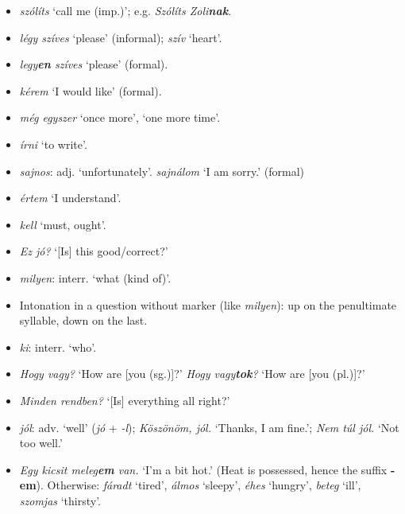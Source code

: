\documentclass[a4paper,11pt]{article}
\begin{document}
\begin{itemize}
  \item \emph{szólíts} `call me (imp.)'; e.g. \emph{Szólíts
  Zoli\textbf{nak}}.

  \item \emph{légy szíves} `please' (informal); \emph{szív} `heart'.

  \item \emph{legy\textbf{en} szíves} `please' (formal).

  \item \emph{kérem} `I would like' (formal).

  \item  \emph{még egyszer} `once more', `one more time'.

  \item \emph{írni} `to write'.

  \item \emph{sajnos}: adj. `unfortunately'. \emph{sajnálom} `I am
    sorry.' (formal)

  \item \emph{értem} `I understand'.

  \item \emph{kell} `must, ought'.

  \item \emph{Ez jó?} `[Is] this good/correct?'

  \item \emph{milyen}: interr. `what (kind of)'.

  \item Intonation in a question without marker (like \emph{milyen}):
    up on the penultimate syllable, down on the last.

  \item \emph{ki}: interr. `who'.

  \item \emph{Hogy vagy?} `How are [you (sg.)]?' \emph{Hogy
  vagy\textbf{tok}?} `How are [you (pl.)]?'

  \item \emph{Minden rendben?} `[Is] everything all right?'

  \item \emph{jól}: adv. `well' (\emph{jó} + \emph{-l});
    \emph{Köszönöm, jól.} `Thanks, I am fine.'; \emph{Nem túl jól.}
    `Not too well.'

  \item \emph{Egy kicsit meleg\textbf{em} van.} `I'm a bit hot.'
    (Heat is possessed, hence the suffix \textbf{-em}). Otherwise:
    \emph{fáradt} `tired', \emph{álmos} `sleepy', \emph{éhes}
    `hungry', \emph{beteg} `ill', \emph{szomjas} `thirsty'.


\end{itemize}
\end{document}
